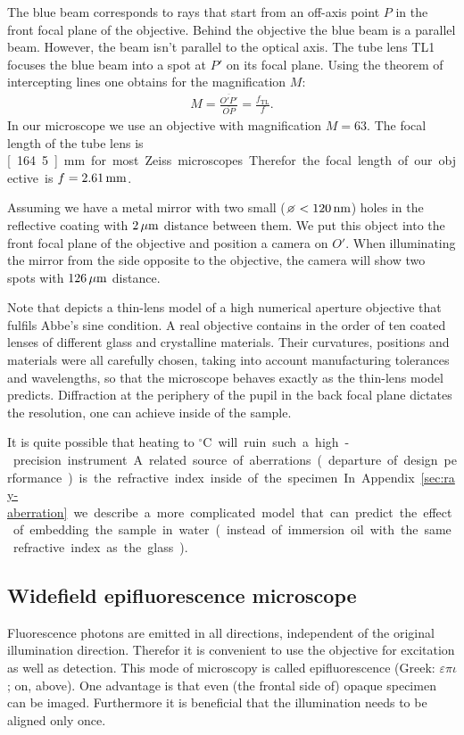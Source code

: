 The blue beam corresponds to rays that start from an off-axis point
$P$ in the front focal plane of the objective. Behind the objective
the blue beam is a parallel beam. However, the beam isn't parallel to
the optical axis. The tube lens TL1 focuses the blue beam into a spot
at $P'$ on its focal plane. Using the theorem of intercepting lines
one obtains for the magnification $M$:
\begin{align}
  M=\frac{\overline{O'P'}}{\overline{OP}}=\frac{f_\textrm{TL}}{f}.
\end{align}
In our microscope we use an objective with magnification $M=63$. The
focal length of the tube lens is \unit[164.5]{mm} for most Zeiss
microscopes. Therefor the focal length of our objective is
$f=\unit[2.61]{mm}$.

Assuming we have a metal mirror with two small
($\diameter<\unit[120]{nm}$) holes in the reflective coating with
$\unit[2]{\mu m}$ distance between them.  We put this object into the
front focal plane of the objective and position a camera on $O'$. When
illuminating the mirror from the side opposite to the objective, the
camera will show two spots with $\unit[126]{\mu m}$ distance.


Note that  depicts a thin-lens model
of a high numerical aperture objective that fulfils Abbe's sine
condition. A real objective contains in the order of ten coated lenses
of different glass and crystalline materials. Their curvatures,
positions and materials were all carefully chosen, taking into account
manufacturing tolerances and wavelengths, so that the microscope
behaves exactly as the thin-lens model predicts. Diffraction at the
periphery of the pupil in the back focal plane dictates the
resolution, one can achieve inside of the sample.

It is quite possible that heating to \unit[37]{${}^\circ$C} will ruin
such a high-precision instrument. A related source of aberrations
(departure of design performance) is the refractive index inside of
the specimen. In Appendix~\ref{sec:ray-aberration} we describe a more
complicated model that can predict the effect of embedding the sample
in water (instead of immersion oil with the same refractive index as
the glass).

\subsection{Widefield epifluorescence microscope}
Fluorescence photons are emitted in all directions, independent of the
original illumination direction. Therefor it is convenient to use the
objective for excitation as well as detection. This mode of microscopy
is called epifluorescence (Greek: $\varepsilon\pi\iota$; on, above).
One advantage is that even (the frontal side of) opaque specimen can
be imaged. Furthermore it is beneficial that the illumination needs to
be aligned only once.

